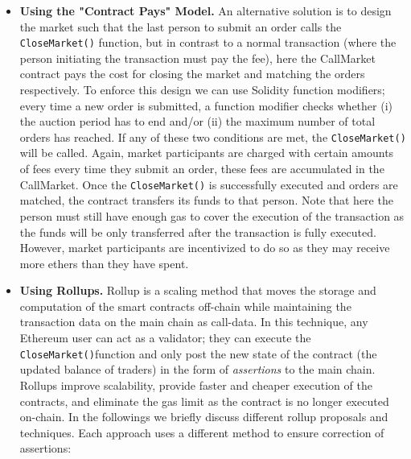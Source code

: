 \begin{itemize}
\begin{itemize}


\item \textbf{Using the "Contract Pays" Model.} An alternative solution is to design the market such that the last person to submit an order calls the \texttt{CloseMarket()} function, but in contrast to a normal transaction (where the person initiating the transaction must pay the fee), here the CallMarket contract pays the cost for closing the market and matching the orders respectively. To enforce this design we can use Solidity function modifiers; every time a new order is submitted, a function modifier checks whether (i) the auction period has to end and/or (ii) the maximum number of total orders has reached. If any of these two conditions are met, the \texttt{CloseMarket()} will be called. Again, market participants are charged with certain amounts of fees every time they submit an order, these fees are accumulated in the CallMarket. Once the \texttt{CloseMarket()} is successfully executed and orders are matched, the contract transfers its funds to that person. Note that here the person must still have enough gas to cover the execution of the transaction as the funds will be only transferred after the transaction is fully executed. However, market participants are incentivized to do so as they may receive more ethers than they have spent.


\label{sec:rollups}
\item \textbf{Using Rollups.} Rollup is a scaling method that moves the storage and computation of the smart contracts off-chain while maintaining the transaction data on the main chain as call-data. In this technique, any Ethereum user can act as a validator; they can execute the \texttt{CloseMarket()}function and only post the new state of the contract (the updated balance of traders) in the form of \textit{assertions} to the main chain. Rollups improve scalability, provide faster and cheaper execution of the contracts, and eliminate the gas limit as the contract is no longer executed on-chain.
In the followings we briefly discuss different rollup proposals and techniques. Each approach uses a different method to ensure correction of assertions:


\begin{itemize}


\end{itemize}
\end{itemize}
\end{itemize}
